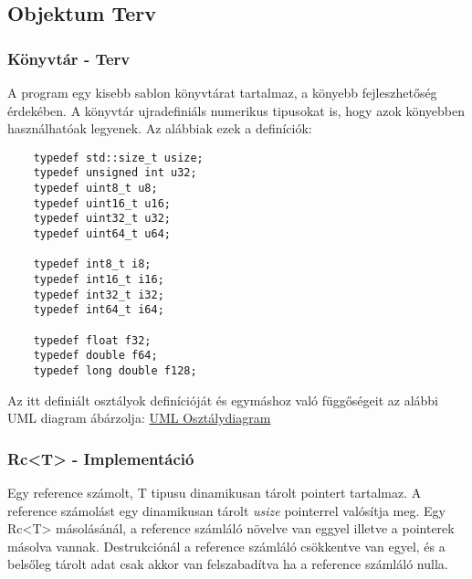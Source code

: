 \documentclass{article}[12pt,a4paper]
\begin{document}
    \subsection{Objektum Terv}

    \subsubsection{Könyvtár - Terv}
    A program egy kisebb sablon könyvtárat tartalmaz, a könyebb fejleszhetőség érdekében.
    A könyvtár ujradefiniáls numerikus tipusokat is, hogy azok könyebben használhatóak legyenek.
    Az alábbiak ezek a definíciók:
    \begin{lstlisting}
    typedef std::size_t usize;
    typedef unsigned int u32;
    typedef uint8_t u8;
    typedef uint16_t u16;
    typedef uint32_t u32;
    typedef uint64_t u64;

    typedef int8_t i8;
    typedef int16_t i16;
    typedef int32_t i32;
    typedef int64_t i64;

    typedef float f32;
    typedef double f64;
    typedef long double f128;
    \end{lstlisting}

    Az itt definiált osztályok definícióját és egymáshoz való függőségeit az alábbi UML diagram ábárzolja:
    \href{https://i.imgur.com/JLrMsF5.png}{UML Osztálydiagram}

    \subsubsection{Rc<T> - Implementáció}
    Egy reference számolt, T tipusu dinamikusan tárolt pointert tartalmaz.
    A reference számolást egy dinamikusan tárolt \textit{usize} pointerrel valósítja meg.
    Egy Rc<T> másolásánál, a reference számláló növelve van eggyel illetve a pointerek másolva vannak.
    Destrukciónál a reference számláló csökkentve van egyel, és a belsőleg tárolt adat csak akkor van felszabadítva ha a reference számláló nulla.
\end{document}
